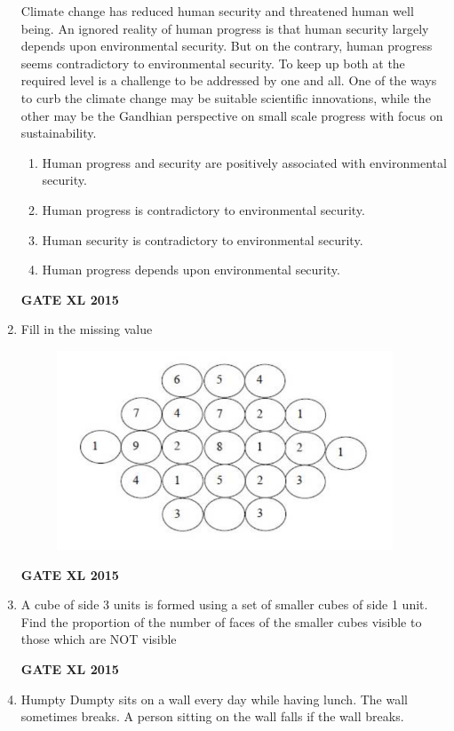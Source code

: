 \documentclass[journal,12pt,onecolumn]{IEEEtran}
\begin{document}
\begin{enumerate}
Climate change has reduced human security and threatened human well being. An ignored reality of human progress is that human security largely depends upon environmental security. But on the contrary, human progress seems contradictory to environmental security. To keep up both at the required level is a challenge to be addressed by one and all. One of the ways to curb the climate change may be suitable scientific innovations, while the other may be the Gandhian perspective on small scale progress with focus on sustainability.
    \begin{enumerate}
            \item Human progress and security are positively associated with environmental security.
            \item Human progress is contradictory to environmental security.
	\item Human security is contradictory to environmental security.  
            \item Human progress depends upon environmental security.
    \end{enumerate}
\begin{flushright}\textbf{GATE XL 2015}\end{flushright}
\item Fill in the missing value
	\begin{figure}[h!]
	\includegraphics[width=10cm]{8}
	\caption*{}
	\label{fig:Q8}
	\end{figure}
\begin{flushright}\textbf{GATE XL 2015}\end{flushright}
\item 
A cube of side 3 units is formed using a set of smaller cubes of side 1 unit. Find the proportion of the number of faces of the smaller cubes visible to those which are NOT visible
    \begin{enumerate}
    \end{enumerate}
\begin{flushright}\textbf{GATE XL 2015}\end{flushright}
\item Humpty Dumpty sits on a wall every day while having lunch. The wall sometimes breaks. A person sitting on the wall falls if the wall breaks.


\end{enumerate}
\end{document}
